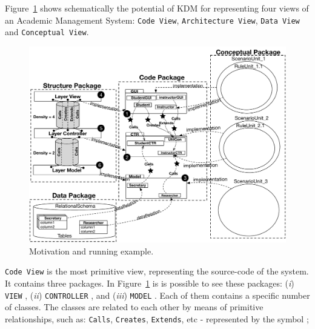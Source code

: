 Figure~\ref{fig:system} shows schematically the potential of KDM for representing four views of an Academic Management System: \texttt{Code View}, \texttt{Architecture View}, \texttt{Data View} and \texttt{Conceptual View}.
%
%
\begin{figure}
	\centering
	\includegraphics[scale=0.58]{figuras/NewSystemVersion}
	\caption{Motivation and running example.}
	\label{fig:system}
\end{figure}
%
\texttt{Code View} is the most primitive view, representing the source-code of the system. It contains three packages. In Figure~\ref{fig:system} is is possible to see these packages: (\textit{i}) \texttt{VIEW} , (\textit{ii}) \texttt{CONTROLLER} , and (\textit{iii}) \texttt{MODEL} . Each of them contains a specific number of classes. %
The classes are related to each other by means of primitive relationships, such as: \texttt{Calls}, \texttt{Creates}, \texttt{Extends}, etc -  represented by the symbol ;

